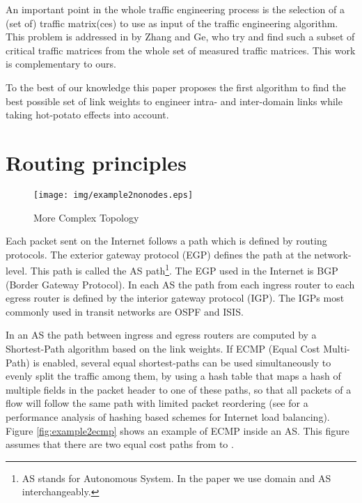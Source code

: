 \documentclass{acm_proc_article-sp}
\begin{document}
An important point in the whole traffic engineering process is the
selection of a (set of) traffic matrix(ces) to use as input of the
traffic engineering algorithm. This problem is addressed in \cite{zhang} by Zhang and Ge, who try and
find such a subset of critical traffic matrices from the whole set of
measured traffic matrices. This work is complementary to ours.

To the best of our knowledge this paper proposes the first algorithm to find the
best possible set of link weights to engineer intra- and
  inter-domain links while taking hot-potato effects into account. 

\section{Routing principles}
\label{sec:survey}

\bigskip

\begin{figure}[htbp]
  \centering
  \texttt{[image: img/example2nonodes.eps]}
  \caption{More Complex Topology}
  \label{fig:example2nonodes}
\end{figure}

Each packet sent on the Internet follows a path which is defined by
routing protocols. The exterior gateway
protocol (EGP) defines the path at the network-level. This path is called
the AS path\footnote{AS stands for Autonomous System. In the paper we use domain
  and AS interchangeably.}. The EGP used
in the Internet is BGP (Border Gateway Protocol). In each AS the path
from each ingress router to each egress router is defined by the
interior gateway protocol (IGP). The IGPs most commonly used in
transit networks are OSPF and ISIS. 

In an AS the path between ingress and egress routers are
computed by a Shortest-Path algorithm based on the
link weights. If ECMP (Equal Cost Multi-Path) is enabled, several equal shortest-paths
can be used simultaneously to evenly
split the traffic among them, by using a hash table that
maps a hash of multiple fields in the packet header to one of these paths, 
so that all packets of a flow
will follow the same path with limited packet reordering (see
\cite{cao} for a performance analysis of hashing based schemes for
Internet load balancing). Figure \ref{fig:example2ecmp} shows an
example of ECMP inside an AS. This figure assumes that there are 
two equal cost paths from  to .
\end{document}

